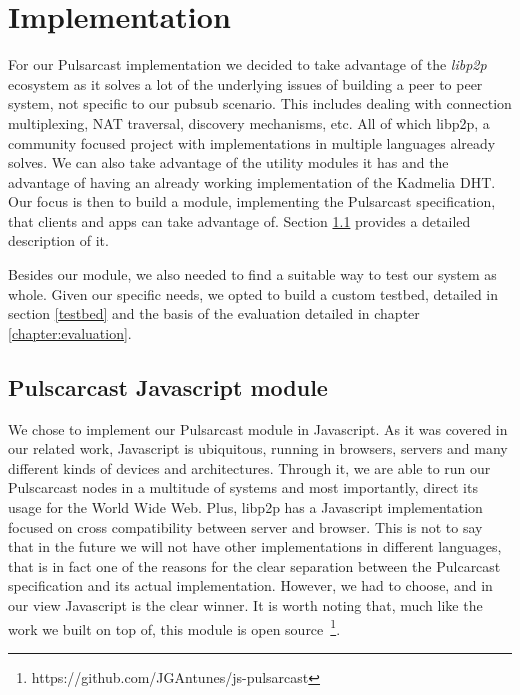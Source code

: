 
\chapter{Implementation}
\label{chapter:implementation}

For our Pulsarcast implementation we decided to take advantage of the
\emph{libp2p} ecosystem as it solves a lot of the underlying issues of building
a peer to peer system, not specific to our pubsub scenario. This includes
dealing with connection multiplexing, NAT traversal, discovery mechanisms, etc.
All of which libp2p, a community focused project with implementations in
multiple languages already solves. We can also take advantage of the utility
modules it has and the advantage of having an already working implementation of
the Kadmelia DHT. Our focus is then to build a module, implementing the
Pulsarcast specification, that clients and apps can take advantage of. Section
\ref{pulsarcast-javascript-module} provides a detailed description of it.

Besides our module, we also needed to find a suitable way to test our system as
whole. Given our specific needs, we opted to build a custom testbed, detailed
in section \ref{testbed} and the basis of the evaluation detailed in chapter
\ref{chapter:evaluation}. 

\section{Pulscarcast Javascript module}\label{pulsarcast-javascript-module}

We chose to implement our Pulsarcast module in Javascript. As it was covered in
our related work, Javascript is ubiquitous, running in browsers, servers and
many different kinds of devices and architectures. Through it, we are able to
run our Pulscarcast nodes in a multitude of systems and most importantly,
direct its usage for the World Wide Web. Plus, libp2p has a Javascript
implementation focused on cross compatibility between server and browser. This
is not to say that in the future we will not have other implementations in
different languages, that is in fact one of the reasons for the clear
separation between the Pulcarcast specification and its actual implementation.
However, we had to choose, and in our view Javascript is the clear winner. It is worth noting that, much like the work we built on top of, this module is open source~\footnote{https://github.com/JGAntunes/js-pulsarcast}.

